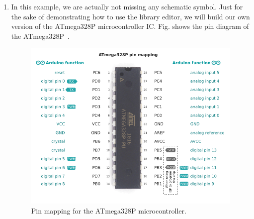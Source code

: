 \documentclass[12pt,letterpaper]{scrartcl}
\begin{document}
\begin{enumerate}
	\item In this example, we are actually not missing any schematic symbol. Just for the sake of demonstrating how to use the library editor, we will build our own version of the ATmega328P microcontroller IC. Fig. shows the pin diagram of the ATmega328P~\cite{atmega328p}.
		\begin{figure}[h]
			\centering
			\includegraphics[width=5in]{atmega328p-pins}
			\caption{Pin mapping for the ATmega328P microcontroller.}
			\label{fig:atmega328p-pins}
		\end{figure}


\end{enumerate}
\end{document}
